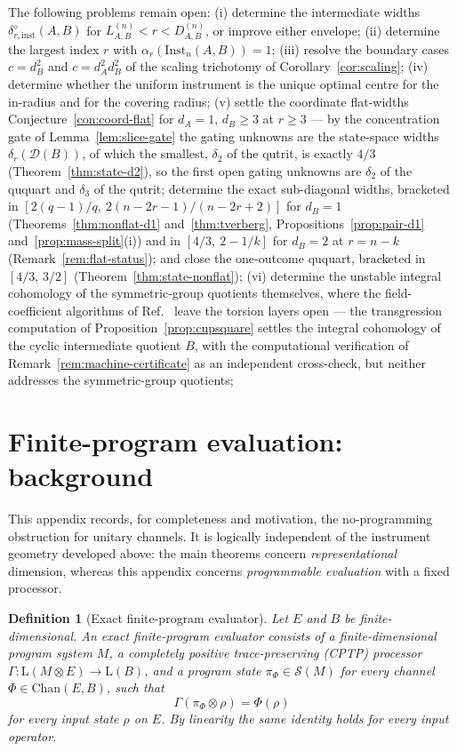 \documentclass[11pt,a4paper]{article}
\newtheorem{definition}[theorem]{Definition}
\newcommand{\Lin}{\mathrm{L}}
\newcommand{\Sstate}{\mathcal{S}}
\newcommand{\Chan}{\mathrm{Chan}}
\newcommand{\Inst}{\mathrm{Inst}}
\begin{document}
The following problems remain open: (i) determine the intermediate widths $\delta_{r,\mathrm{inst}}^{\diamond}(A,B)$ for $L_{A,B}^{(n)}<r<D_{A,B}^{(n)}$, or improve either envelope; (ii) determine the largest index $r$ with $\alpha_r(\Inst_n(A,B))=1$; (iii) resolve the boundary cases $c=d_B^2$ and $c=d_A^2d_B^2$ of the scaling trichotomy of Corollary~\ref{cor:scaling}; (iv) determine whether the uniform instrument is the unique optimal centre for the in-radius and for the covering radius; (v) settle the coordinate flat-widths Conjecture~\ref{con:coord-flat} for $d_A=1$, $d_B\ge3$ at $r\ge3$ --- by the concentration gate of Lemma~\ref{lem:slice-gate} the gating unknowns are the state-space widths $\delta_r(\mathcal D(B))$, of which the smallest, $\delta_2$ of the qutrit, is exactly $4/3$ (Theorem~\ref{thm:state-d2}), so the first open gating unknowns are $\delta_2$ of the ququart and $\delta_3$ of the qutrit; determine the exact sub-diagonal widths, bracketed in $[2(q-1)/q,\ 2(n-2r-1)/(n-2r+2)]$ for $d_B=1$ (Theorems~\ref{thm:nonflat-d1} and~\ref{thm:tverberg}, Propositions~\ref{prop:pair-d1} and~\ref{prop:mass-split}(i)) and in $[4/3,\ 2-1/k]$ for $d_B=2$ at $r=n-k$ (Remark~\ref{rem:flat-status}); and close the one-outcome ququart, bracketed in $[4/3,\,3/2]$ (Theorem~\ref{thm:state-nonflat}); (vi) determine the unstable integral cohomology of the symmetric-group quotients themselves, where the field-coefficient algorithms of Ref.~\cite{GuerraJana2025} leave the torsion layers open --- the transgression computation of Proposition~\ref{prop:cupsquare} settles the integral cohomology of the cyclic intermediate quotient $B$, with the computational verification of Remark~\ref{rem:machine-certificate} as an independent cross-check, but neither addresses the symmetric-group quotients;

\appendix

\section{Finite-program evaluation: background}
\label{app:no-programming}

This appendix records, for completeness and motivation, the no-programming obstruction for unitary channels. It is logically independent of the instrument geometry developed above: the main theorems concern \emph{representational} dimension, whereas this appendix concerns \emph{programmable evaluation} with a fixed processor.

\begin{definition}[Exact finite-program evaluator]
Let $E$ and $B$ be finite-dimensional. An exact finite-program evaluator consists of a finite-dimensional program system $M$, a completely positive trace-preserving (CPTP) processor $\Gamma:\Lin(M\otimes E)\to\Lin(B)$, and a program state $\pi_\Phi\in\Sstate(M)$ for every channel $\Phi\in\Chan(E,B)$, such that
\[
\Gamma(\pi_\Phi\otimes\rho)=\Phi(\rho)
\]
for every input state $\rho$ on $E$. By linearity the same identity holds for every input operator.
\end{definition}
\end{document}
